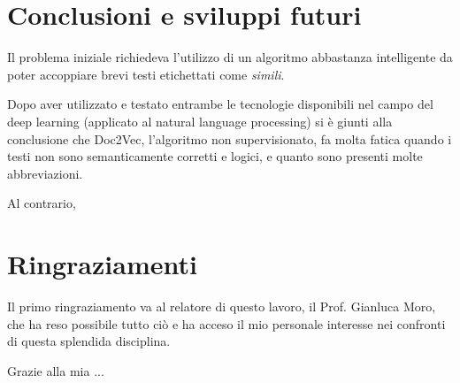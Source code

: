 \documentclass[12pt,a4paper,twoside,openright]{book}
\begin{document}

\chapter*{Conclusioni e sviluppi futuri}

Il problema iniziale richiedeva l'utilizzo di un algoritmo abbastanza intelligente da poter accoppiare brevi testi etichettati come \emph{simili}.

Dopo aver utilizzato e testato entrambe le tecnologie disponibili nel campo del deep learning (applicato al natural language processing) si è giunti alla conclusione che Doc2Vec, l'algoritmo non supervisionato, fa molta fatica quando i testi non sono semanticamente corretti e logici, e quanto sono presenti molte abbreviazioni.

Al contrario, 

\chapter*{Ringraziamenti}

Il primo ringraziamento va al relatore di questo lavoro, il Prof. Gianluca Moro, che ha reso possibile tutto ciò e ha acceso il mio personale interesse nei confronti di questa splendida disciplina.

Grazie alla mia ...
	
\backmatter	
{}


\end{document}
